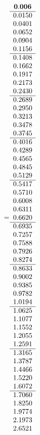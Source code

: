 =\hbox{$\begin{array}{c}
\bf 0.006 
 \\ \hline 
  0.0150 \\ 
  0.0401 \\ 
  0.0652 \\ 
  0.0904 \\ 
  0.1156
 \\ \hline 
  0.1408 \\ 
  0.1662 \\ 
  0.1917 \\ 
  0.2173 \\ 
  0.2430
 \\ \hline 
  0.2689 \\ 
  0.2950 \\ 
  0.3213 \\ 
  0.3478 \\ 
  0.3745
 \\ \hline 
  0.4016 \\ 
  0.4289 \\ 
  0.4565 \\ 
  0.4845 \\ 
  0.5129
 \\ \hline 
  0.5417 \\ 
  0.5710 \\ 
  0.6008 \\ 
  0.6311 \\ 
  0.6620
 \\ \hline 
  0.6935 \\ 
  0.7257 \\ 
  0.7588 \\ 
  0.7926 \\ 
  0.8274
 \\ \hline 
  0.8633 \\ 
  0.9002 \\ 
  0.9385 \\ 
  0.9782 \\ 
  1.0194
 \\ \hline 
  1.0625 \\ 
  1.1077 \\ 
  1.1552 \\ 
  1.2055 \\ 
  1.2591
 \\ \hline 
  1.3165 \\ 
  1.3787 \\ 
  1.4466 \\ 
  1.5220 \\ 
  1.6072
 \\ \hline 
  1.7060 \\ 
  1.8250 \\ 
  1.9774 \\ 
  2.1973 \\ 
  2.6521
 \end{array}$}
